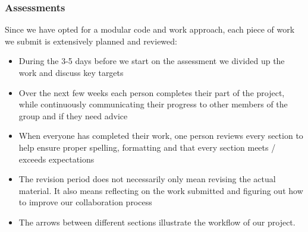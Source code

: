 \documentclass[coverpage,lineno]{../custom}
\begin{document}
\subsubsection{Assessments}
Since we have opted for a modular code and work approach, each piece of work we submit is extensively planned and reviewed:
\begin{itemize}
    \item During the 3-5 days before we start on the assessment we divided up the work and discuss key targets
    \item Over the next few weeks each person completes their part of the project, while continuously communicating their progress to other members of the group  and if they need advice
    \item When everyone has completed their work, one person reviews every section to help ensure proper spelling, formatting and that every section meets / exceeds expectations
    \item The revision period does not necessarily only mean revising the actual material. It also means reflecting on the work submitted and figuring out how to improve our collaboration process
    \item The arrows between different sections illustrate the workflow of our project.
\end{itemize}
\end{document}
